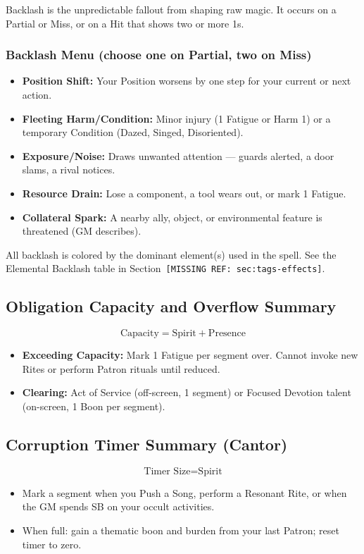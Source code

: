 Backlash is the unpredictable fallout from shaping raw magic. It occurs on a Partial or Miss, or on a Hit that shows two or more 1s.

\subsubsection{Backlash Menu (choose one on Partial, two on Miss)}
\begin{itemize}
  \item \textbf{Position Shift:} Your Position worsens by one step for your current or next action.
  \item \textbf{Fleeting Harm/Condition:} Minor injury (1 Fatigue or Harm 1) or a temporary Condition (Dazed, Singed, Disoriented).
  \item \textbf{Exposure/Noise:} Draws unwanted attention --- guards alerted, a door slams, a rival notices.
  \item \textbf{Resource Drain:} Lose a component, a tool wears out, or mark 1 Fatigue.
  \item \textbf{Collateral Spark:} A nearby ally, object, or environmental feature is threatened (GM describes).
\end{itemize}

All backlash is colored by the dominant element(s) used in the spell. See the Elemental Backlash table in Section~\texttt{[MISSING REF: sec:tags-effects]}.

\subsection{Obligation Capacity and Overflow Summary}

\[
\text{Capacity} = \text{Spirit} + \text{Presence}
\]

\begin{itemize}
  \item \textbf{Exceeding Capacity:} Mark 1 Fatigue per segment over. Cannot invoke new Rites or perform Patron rituals until reduced.
  \item \textbf{Clearing:} Act of Service (off-screen, 1 segment) or Focused Devotion talent (on-screen, 1 Boon per segment).
\end{itemize}

\subsection{Corruption Timer Summary (Cantor)}

\[
\text{Timer Size} = \text{Spirit}
\]

\begin{itemize}
  \item Mark a segment when you Push a Song, perform a Resonant Rite, or when the GM spends SB on your occult activities.
  \item When full: gain a thematic boon and burden from your last Patron; reset timer to zero.
\end{itemize}